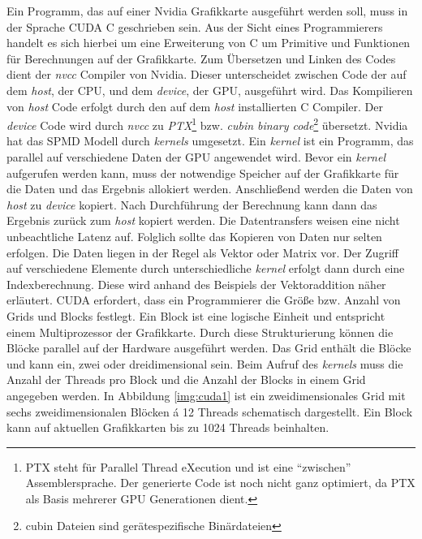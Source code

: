 Ein Programm, das auf einer Nvidia Grafikkarte ausgeführt werden soll, muss in der Sprache CUDA C geschrieben sein. Aus der Sicht eines Programmierers handelt es sich hierbei um eine Erweiterung von C um Primitive und Funktionen für Berechnungen auf der Grafikkarte. Zum Übersetzen und Linken des Codes dient der \textit{nvcc} Compiler von Nvidia. Dieser unterscheidet zwischen Code der auf dem \textit{host}, der CPU, und dem \textit{device}, der GPU, ausgeführt wird. Das Kompilieren von \textit{host} Code erfolgt durch den auf dem \textit{host} installierten C Compiler. Der \textit{device} Code wird durch \textit{nvcc} zu \textit{PTX}\footnote{PTX steht für Parallel Thread eXecution und ist eine \enquote{zwischen} Assemblersprache. Der generierte Code ist noch nicht ganz optimiert, da PTX als Basis mehrerer GPU Generationen dient.} bzw. \textit{cubin binary code}\footnote{cubin Dateien sind gerätespezifische Binärdateien} übersetzt.
Nvidia hat das SPMD Modell durch \textit{kernels} umgesetzt. Ein \textit{kernel} ist ein Programm, das parallel auf verschiedene Daten der GPU angewendet wird. 
Bevor ein \textit{kernel} aufgerufen werden kann, muss der notwendige Speicher auf der Grafikkarte für die Daten und das Ergebnis allokiert werden. Anschließend werden die Daten von \textit{host} zu \textit{device} kopiert. Nach Durchführung der Berechnung kann dann das Ergebnis zurück zum \textit{host} kopiert werden. Die Datentransfers weisen eine nicht unbeachtliche Latenz auf. Folglich sollte das Kopieren von Daten nur selten erfolgen.\newline
Die Daten liegen in der Regel als Vektor oder Matrix vor. Der Zugriff auf verschiedene Elemente durch unterschiedliche \textit{kernel} erfolgt dann durch eine Indexberechnung. Diese wird anhand des Beispiels der Vektoraddition näher erläutert.\newline
CUDA erfordert, dass ein Programmierer die Größe bzw. Anzahl von Grids und Blocks festlegt. Ein Block ist eine logische Einheit und entspricht einem Multiprozessor der Grafikkarte. Durch diese Strukturierung können die Blöcke parallel auf der Hardware ausgeführt werden. Das Grid enthält die Blöcke und kann ein, zwei oder dreidimensional sein. Beim Aufruf des \textit{kernels} muss die Anzahl der Threads pro Block und die Anzahl der Blocks in einem Grid angegeben werden. In Abbildung \ref{img:cuda1} ist ein zweidimensionales Grid mit sechs zweidimensionalen Blöcken á 12 Threads schematisch dargestellt. Ein Block kann auf aktuellen Grafikkarten bis zu 1024 Threads beinhalten.

